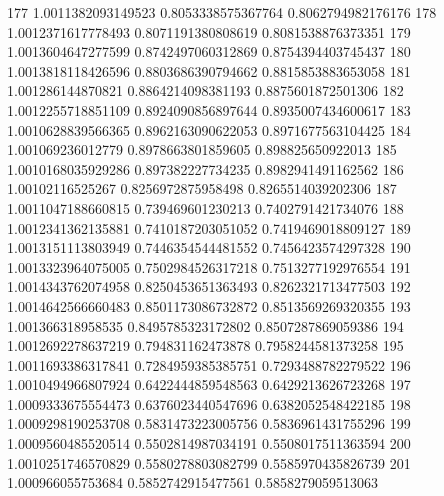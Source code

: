 177	1.0011382093149523	0.8053338575367764	0.8062794982176176
178	1.0012371617778493	0.8071191380808619	0.8081538876373351
179	1.0013604647277599	0.8742497060312869	0.8754394403745437
180	1.0013818118426596	0.8803686390794662	0.8815853883653058
181	1.001286144870821	0.8864214098381193	0.8875601872501306
182	1.0012255718851109	0.8924090856897644	0.8935007434600617
183	1.0010628839566365	0.8962163090622053	0.8971677563104425
184	1.001069236012779	0.8978663801859605	0.898825650922013
185	1.0010168035929286	0.897382227734235	0.8982941491162562
186	1.00102116525267	0.8256972875958498	0.8265514039202306
187	1.0011047188660815	0.739469601230213	0.7402791421734076
188	1.0012341362135881	0.7410187203051052	0.7419469018809127
189	1.0013151113803949	0.7446354544481552	0.7456423574297328
190	1.0013323964075005	0.7502984526317218	0.7513277192976554
191	1.0014343762074958	0.8250453651363493	0.8262321713477503
192	1.0014642566660483	0.8501173086732872	0.8513569269320355
193	1.001366318958535	0.8495785323172802	0.8507287869059386
194	1.0012692278637219	0.794831162473878	0.7958244581373258
195	1.0011693386317841	0.7284959385385751	0.7293488782279522
196	1.0010494966807924	0.6422444859548563	0.6429213626723268
197	1.0009333675554473	0.6376023440547696	0.6382052548422185
198	1.0009298190253708	0.5831473223005756	0.5836961431755296
199	1.0009560485520514	0.5502814987034191	0.5508017511363594
200	1.0010251746570829	0.5580278803082799	0.5585970435826739
201	1.000966055753684	0.5852742915477561	0.5858279059513063